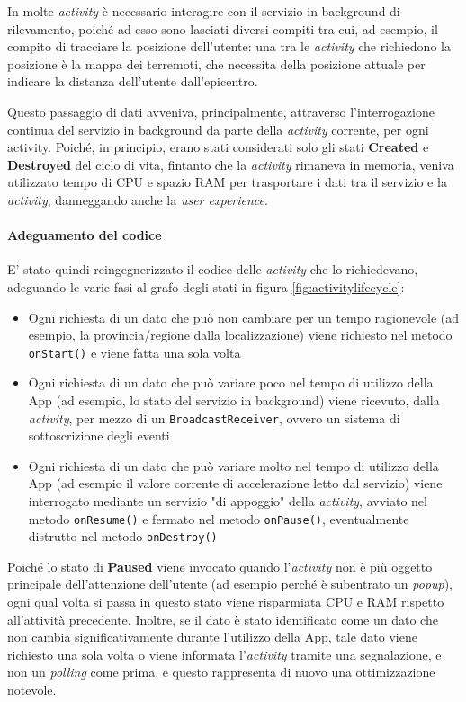 \documentclass[a4paper,10pt]{memoir}
\begin{document}
In molte \textit{activity} è necessario interagire con il servizio in background di rilevamento, poiché ad esso sono lasciati diversi compiti tra cui, ad esempio, il compito di tracciare la posizione dell'utente: una tra le \textit{activity} che richiedono la posizione è la mappa dei terremoti, che necessita della posizione attuale per indicare la distanza dell'utente dall'epicentro.

Questo passaggio di dati avveniva, principalmente, attraverso l'interrogazione continua del servizio in background da parte della \textit{activity} corrente, per ogni activity. Poiché, in principio, erano stati considerati solo gli stati \textbf{Created} e \textbf{Destroyed} del ciclo di vita, fintanto che la \textit{activity} rimaneva in memoria, veniva utilizzato tempo di CPU e spazio RAM per trasportare i dati tra il servizio e la \textit{activity}, danneggando anche la \textit{user experience}.

\paragraph{Adeguamento del codice} E' stato quindi reingegnerizzato il codice delle \textit{activity} che lo richiedevano, adeguando le varie fasi al grafo degli stati in figura \ref{fig:activitylifecycle}:
\begin{itemize}
\item Ogni richiesta di un dato che può non cambiare per un tempo ragionevole (ad esempio, la provincia/regione dalla localizzazione) viene richiesto nel metodo \texttt{onStart()} e viene fatta una sola volta
\item Ogni richiesta di un dato che può variare poco nel tempo di utilizzo della App (ad esempio, lo stato del servizio in background) viene ricevuto, dalla \textit{activity}, per mezzo di un \texttt{BroadcastReceiver}, ovvero un sistema di sottoscrizione degli eventi
\item Ogni richiesta di un dato che può variare molto nel tempo di utilizzo della App (ad esempio il valore corrente di accelerazione letto dal servizio) viene interrogato mediante un servizio "di appoggio" della \textit{activity}, avviato nel metodo \texttt{onResume()} e fermato nel metodo \texttt{onPause()}, eventualmente distrutto nel metodo \texttt{onDestroy()}
\end{itemize}

Poiché lo stato di \textbf{Paused} viene invocato quando l'\textit{activity} non è più oggetto principale dell'attenzione dell'utente (ad esempio perché è subentrato un \textit{popup}), ogni qual volta si passa in questo stato viene risparmiata CPU e RAM rispetto all'attività precedente. Inoltre, se il dato è stato identificato come un dato che non cambia significativamente durante l'utilizzo della App, tale dato viene richiesto una sola volta o viene informata l'\textit{activity} tramite una segnalazione, e non un \textit{polling} come prima, e questo rappresenta di nuovo una ottimizzazione notevole.
\end{document}
